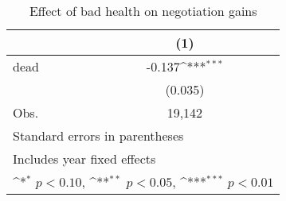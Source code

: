 \begin{table}[htbp]\centering
\def\sym#1{\ifmmode^{#1}\else\(^{#1}\)\fi}
\caption{Effect of bad health on negotiation gains}
\begin{tabular}{l*{1}{c}}
\hline\hline
                    &\multicolumn{1}{c}{(1)}         \\
\hline
dead                &      -0.137\sym{***}\\
                    &     (0.035)         \\
\hline
Obs.                &      19,142         \\
\hline\hline
\multicolumn{2}{l}{\footnotesize Standard errors in parentheses}\\
\multicolumn{2}{l}{\footnotesize Includes year fixed effects}\\
\multicolumn{2}{l}{\footnotesize \sym{*} \(p<0.10\), \sym{**} \(p<0.05\), \sym{***} \(p<0.01\)}\\
\end{tabular}
\end{table}
